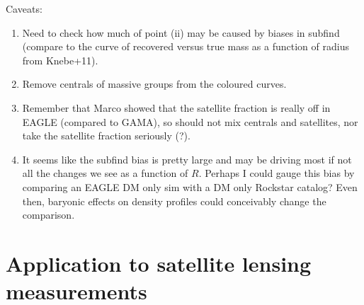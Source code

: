 \documentclass[usenatbib,fleqn]{mnras}
\begin{document}
Caveats:
\begin{enumerate}
 \item Need to check how much of point (ii) may be caused by biases in subfind (compare to the curve of recovered versus true mass as a function of radius from Knebe+11).
 \item Remove centrals of massive groups from the coloured curves.
 \item Remember that Marco showed that the satellite fraction is really off in EAGLE (compared to GAMA), so should not mix centrals and satellites, nor take the satellite fraction seriously (?).
 \item It seems like the subfind bias is pretty large and may be driving most if not all the changes we see as a function of $R$. Perhaps I could gauge this bias by comparing an EAGLE DM only sim with a DM only Rockstar catalog? Even then, baryonic effects on density profiles could conceivably change the comparison.
\end{enumerate}


\section{Application to satellite lensing measurements}




\end{document}
